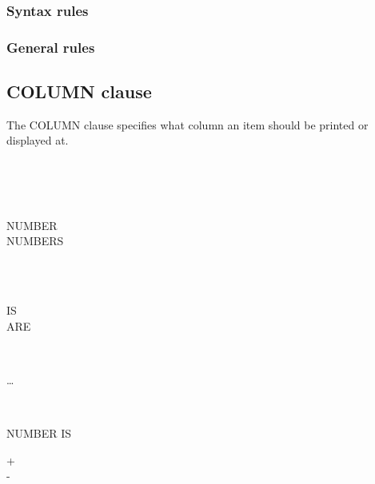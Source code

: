 \subsubsection{Syntax rules}

\subsubsection{General rules}

\subsection{COLUMN clause}

The COLUMN clause specifies what column an item should be printed or displayed at.

\begin{syntax}
  \begin{1=}
     \\
     \\
     \\
  \end{1=}
  \begin{0-1}
    NUMBER \\
    NUMBERS
  \end{0-1}
  \begin{0-1}
     \\
     \\
  \end{0-1}
  \begin{0-1}
    IS \\
    ARE
  \end{0-1}
  \begin{1=}
    \begin{0-1}
    \end{0-1}
    \integer \\

    \begin{1=}
      \integer
    \end{1=} \ldots
  \end{1=}
\end{syntax}

\begin{syntax}
  \begin{1=}
     \\
  \end{1=}
  NUMBER IS
  \begin{0-1}
    + \\
    - \\
     \\
  \end{0-1}
  \begin{1=}
    \identifier \\
    \integer
  \end{1=}
\end{syntax}

